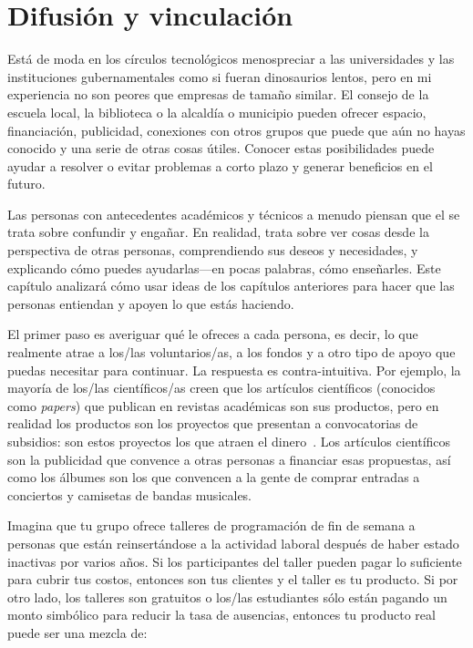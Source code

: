 \chapter{Difusión y vinculación}\label{s:outreach}


Está de moda en los círculos tecnológicos 
menospreciar a las universidades y las instituciones gubernamentales como si fueran dinosaurios lentos, 
pero en mi experiencia no son peores que empresas de tamaño similar.
El consejo de la escuela local, la biblioteca o la alcaldía o municipio pueden ofrecer espacio, 
financiación, publicidad, conexiones con otros grupos que puede que aún no hayas conocido 
y una serie de otras cosas útiles. 
Conocer estas posibilidades puede ayudar a resolver o evitar problemas a corto plazo 
y generar beneficios en el futuro.


Las personas con antecedentes académicos y técnicos a menudo piensan que 
el  se trata sobre confundir y engañar. 
En realidad, trata sobre ver cosas desde la perspectiva de otras personas, 
comprendiendo sus deseos y necesidades, y explicando cómo puedes ayudarlas---en pocas palabras, 
cómo enseñarles.
Este capítulo analizará cómo usar ideas de los capítulos anteriores 
para hacer que las personas entiendan y apoyen lo que estás haciendo.

El primer paso es averiguar qué le ofreces a cada persona, es decir, 
lo que realmente atrae a los/las voluntarios/as, a los fondos y a otro tipo de apoyo que puedas necesitar para continuar.
La respuesta es contra-intuitiva.
Por ejemplo, la mayoría de los/las científicos/as creen 
que los artículos científicos (conocidos como \emph{papers}) 
que publican en revistas académicas son sus productos, 
pero en realidad los productos son los proyectos que presentan a convocatorias de subsidios: 
son estos proyectos los que atraen el dinero~\cite{Kuch2011}.
Los artículos científicos son la publicidad que convence a otras personas a financiar esas propuestas, 
así como los álbumes son los que convencen a la gente de comprar entradas a conciertos y camisetas de bandas musicales.

Imagina que tu grupo ofrece talleres de programación de fin de semana 
a personas que están reinsertándose a la actividad laboral después de haber estado inactivas por varios años.
Si los participantes del taller pueden pagar lo suficiente para cubrir tus costos, 
entonces son tus clientes y el taller es tu producto. Si por otro lado, los talleres son gratuitos 
o los/las estudiantes sólo están pagando un monto simbólico para reducir la tasa de ausencias, 
entonces tu producto real puede ser una mezcla de: 


